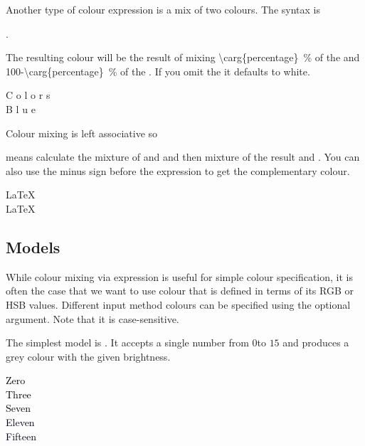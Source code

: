Another type of colour expression is a mix of two colours. The syntax is
\begin{code}
  .
\end{code}
The resulting colour will be the result of mixing
\qty[parse-numbers=false]{\carg{percentage}}{\percent} of the  and \qty[parse-numbers=false]{100-\carg{percentage}}{\percent} of the
. If you omit the  it defaults to white.
\begin{example}
\textcolor{green!100!red}{C}%
\textcolor{green!80!red}{o}%
\textcolor{green!60!red}{l}%
\textcolor{green!40!red}{o}%
\textcolor{green!20!red}{r}%
\textcolor{green!0!red}{s} \\
\textcolor{blue!100}{B}%
\textcolor{blue!75}{l}%
\textcolor{blue!50}{u}%
\textcolor{blue!25}{e}
\end{example}
Colour mixing is left associative so
\begin{code}
\end{code}
means calculate the mixture of  and  and then mixture of the
result and . You can also use the minus sign before the expression to
get the complementary colour.
\begin{example}
\color{green!20!red!60!blue}
\LaTeX{} \\
\color{-green!20!red!60!blue}
\LaTeX{}
\end{example}

\subsection{Models}

While colour mixing via expression is useful for simple colour specification, it
is often the case that we want to use colour that is defined in terms of its RGB
or HSB values. Different input method colours can be specified using the optional
 argument. Note that it is case-sensitive.

The simplest model is . It accepts a single number from \(0\)to
\(15\) and produces a grey colour with the given brightness.
\begin{example}
\textcolor[Gray]{0}{Zero}    \\
\textcolor[Gray]{3}{Three}   \\
\textcolor[Gray]{7}{Seven}   \\
\textcolor[Gray]{11}{Eleven} \\
\textcolor[Gray]{15}{Fifteen}
\end{example}

